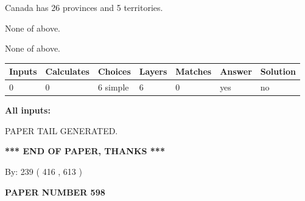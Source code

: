 \documentclass[12pt]{article}
\begin{document}
 
Canada has  26 provinces and  5 territories.
 
 
 None of above.
 
 
\noindent{}
 
 
 None of above.
 
 
\noindent{}
 
 
   
   
   
   
\noindent\begin{tabular}{|l|l|l|l|l|l|l|}
 \hline
Inputs & Calculates & Choices & Layers & Matches & Answer & Solution \\ \hline
 0  & 
 0  & 
 6
  simple  
  & 
 6  & 
 0  & 
  yes & 
  no 
  \\ \hline
 \end{tabular}
   
   
   
   
\noindent{}
   
   
   
   
\noindent\vspace{0.1in}\hspace{-0.08in} {\textbf{\Large{All inputs: }}}
   
   
   
   
   
   
 \vspace{0.2in}
 
   
   
\vspace{2.0in} PAPER TAIL GENERATED.
   
   
   
   
\vspace{1.0in} 
{\textbf{\large{ *** END OF PAPER, THANKS *** }}} 
   
   
\hspace{1.0in} By: 
 239 ( 416 ,  613 )
   
   
   
   
\newpage 
\setcounter{page}{ 
   598001 } 
   
   
   
   
 {\textbf{ \Large{ PAPER NUMBER  598  }}}
   
\end{document}
